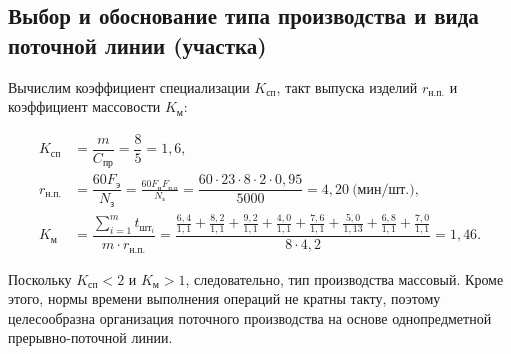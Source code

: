 \subsection{
  Выбор и обоснование типа производства и
  вида поточной линии (участка)
}

Вычислим коэффициент специализации \( K_{\text{сп}} \), 
такт выпуска изделий \( r_{\text{н.п.}}\) и
коэффициент массовости \( K_\text{м} \):

\begin{align*}
K_{\text{сп}} &= \dfrac{m}{C_{\text{пр}}} = \dfrac{8}{5} = 1{,}6, \\
r_{\text{н.п.}} &= \dfrac{60 F_{\text{э}}}{N_{\text{з}}} = 
  \frac{60 F_{\text{н}} F_{\text{п.о}}}{N_{\text{з}}} =
  \dfrac{60 \cdot 23 \cdot 8 \cdot 2 \cdot 0{,}95}{5000} =
  4{,}20 \: \text{(мин/шт.)}, \\
K_{\text{м}} &=
\dfrac{\sum^m_{i=1} t_{\text{шт}_{i}}}{m \cdot r_{\text{н.п.}}} = 
\dfrac{
  \frac{6{,}4}{1{,}1} + \frac{8{,}2}{1{,}1} + \frac{9{,}2}{1{,}1} + 
  \frac{4{,}0}{1{,}1} + \frac{7{,}6}{1{,}1} + \frac{5{,}0}{1{,}13} +
  \frac{6{,}8}{1{,}1} + \frac{7{,}0}{1{,}1}
}{
  8 \cdot 4{,}2
} = 1{,}46.
\end{align*}

Поскольку \( K_{\text{сп}} < 2 \) и \( K_{\text{м}} > 1 \),
следовательно, тип производства массовый.
Кроме этого, нормы времени выполнения операций не кратны такту, 
поэтому целесообразна организация поточного производства на основе
однопредметной прерывно-поточной линии.